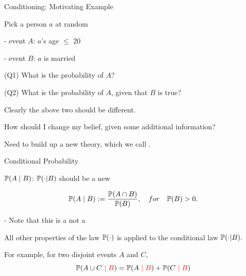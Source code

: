 \documentclass[handout,fleqn,aspectratio=169]{beamer}
\begin{document}
\begin{frame}{Conditioning: Motivating Example}

\plitemsep 0.1in
\bci 

\item Pick a person $a$ at random

- event $A$: $a$'s age $\leq$ 20

- event $B$: $a$ is married


\item (Q1) What is the probability of $A$?

\item (Q2) What is the probability of $A$, given that $B$ is true?

\item Clearly the above two should be different. 

\medskip

\item \question  How should I change my belief, given some additional information?

\item Need to build up a new theory, which we call .

\eci 

\end{frame}

\begin{frame}{Conditional Probability}

\bci

\item $\mathbb{P}( A \mid  B )$: $\mathbb{P}( \cdot | B )$ should be a new 

\item {}
$$
\mathbb{P}( A \mid B ) := \frac{\mathbb{P}( A \cap B )}{\mathbb{P}( B )}, \quad for \quad \mathbb{P}( B ) >0.
$$

- Note that this is a  not a 


\item All other properties of the law $\mathbb{P}( \cdot )$ is applied to the conditional law $\mathbb{P}( \cdot | B ).$ 

\item For example, for two disjoint events $A$ and $C$, 
$$
\mathbb{P}( A \cup C {\color{red} \ \mid B} ) = \mathbb{P}( A {\color{red} \ \mid B} ) + \mathbb{P}( C {\color{red} \ \mid B} )
$$

\eci 

\end{frame}
\end{document}
